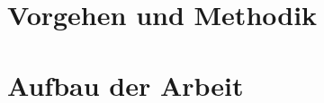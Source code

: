 \section{Vorgehen und Methodik}
%
\label{sec:einl:methodik}%


\section{Aufbau der Arbeit}
%
\label{sec:einl:aufbau}%
